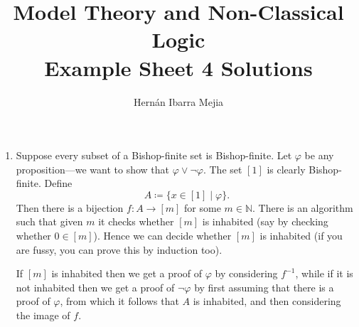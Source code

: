 \documentclass{article}
\theoremstyle{plain}
\begin{document}
	\title{Model Theory and Non-Classical Logic\\ Example Sheet 4 Solutions}
	\author{Hernán Ibarra Mejia}
	\maketitle
	\begin{enumerate}
		\item Suppose every subset of a Bishop-finite set is Bishop-finite. Let $\varphi$ be any proposition---we want to show that $\varphi\vee \neg \varphi$. The set $[1]$ is clearly Bishop-finite. Define 
		\begin{equation*}
			A \coloneqq \{x \in [1] \mid \varphi \}.
		\end{equation*}
		Then there is a bijection $f\colon A \to [m]$ for some $m\in \mathbb{N}$. There is an algorithm such that given $m$ it checks whether $[m]$ is inhabited (say by checking whether $0\in[m]$). Hence we can decide whether $[m]$ is inhabited (if you are fussy, you can prove this by induction too). 
		
		If $[m]$ is inhabited then we get a proof of $\varphi$ by considering $f^{-1}$, while if it is not inhabited then we get a proof of $\neg\varphi$ by first assuming that there is a proof of $\varphi$, from which it follows that $A$ is inhabited, and then considering the image of $f$.
		

\end{enumerate}
\end{document}
